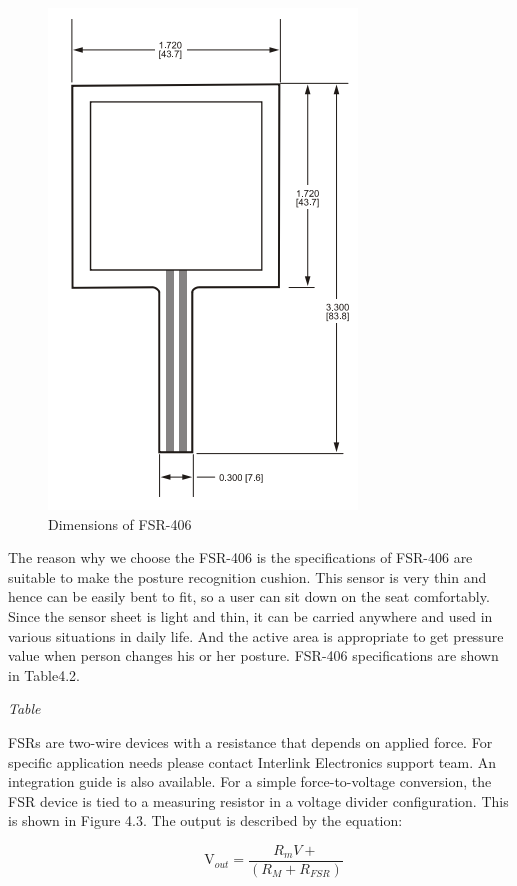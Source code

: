 \documentclass[conference]{IEEEtran}
\begin{document}
\begin{figure}[htbp]
\begin{center}
    \includegraphics[scale=0.6]{img_06.png}
    \caption{Dimensions of FSR-406} 
\end{center}
\end{figure}

The reason why we choose the FSR-406 is the specifications of FSR-406 are suitable to make the posture recognition cushion. This sensor is very thin and hence can be easily bent to fit, so a user can sit down on the seat comfortably. Since the sensor sheet is light and thin, it can be carried anywhere and used in various situations in daily life. And the active area is appropriate to get pressure value when person changes his or her posture. FSR-406 specifications are shown in Table4.2.

\emph{Table}

FSRs are two-wire devices with a resistance that depends on applied force. For specific application needs please contact Interlink Electronics support team. An integration guide is also available. For a simple force-to-voltage conversion, the FSR device is tied to a measuring resistor in a voltage divider configuration. This is shown in Figure 4.3. The output is described by the equation:


\begin{displaymath}
\qquad\mathrm{V}_{out} =\frac{{R}_mV+}{({R}_M+{R}_{FSR})}
\end{displaymath}
\end{document}
